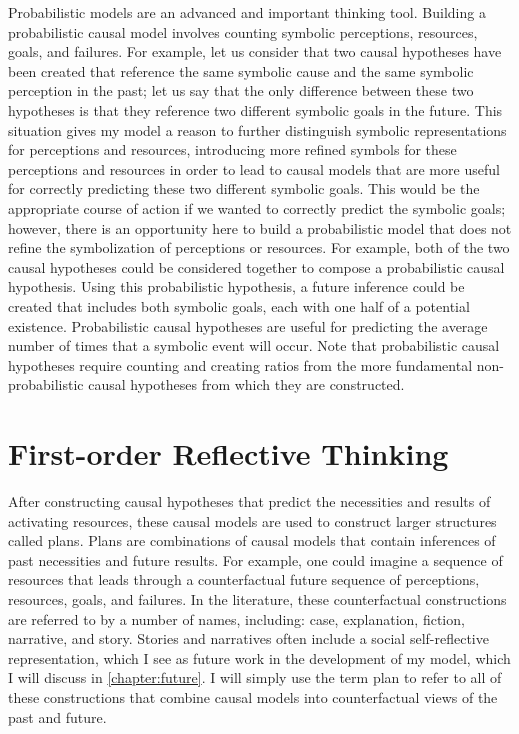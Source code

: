 Probabilistic models are an advanced and important thinking tool.
Building a probabilistic causal model involves counting symbolic
perceptions, resources, goals, and failures.  For example, let us
consider that two causal hypotheses have been created that reference
the same symbolic cause and the same symbolic perception in the past;
let us say that the only difference between these two hypotheses is
that they reference two different symbolic goals in the future.  This
situation gives my model a reason to further distinguish symbolic
representations for perceptions and resources, introducing more
refined symbols for these perceptions and resources in order to lead
to causal models that are more useful for correctly predicting these
two different symbolic goals.  This would be the appropriate course of
action if we wanted to correctly predict the symbolic goals; however,
there is an opportunity here to build a probabilistic model that does
not refine the symbolization of perceptions or resources.  For
example, both of the two causal hypotheses could be considered
together to compose a probabilistic causal hypothesis.  Using this
probabilistic hypothesis, a future inference could be created that
includes both symbolic goals, each with one half of a potential
existence.  Probabilistic causal hypotheses are useful for predicting
the average number of times that a symbolic event will occur.  Note
that probabilistic causal hypotheses require counting and creating
ratios from the more fundamental non-probabilistic causal hypotheses
from which they are constructed.

\section{First-order Reflective Thinking}

After constructing causal hypotheses that predict the necessities and
results of activating resources, these causal models are used to
construct larger structures called plans.  Plans are combinations of
causal models that contain inferences of past necessities and future
results.  For example, one could imagine a sequence of resources that
leads through a counterfactual future sequence of perceptions,
resources, goals, and failures.  In the literature, these
counterfactual constructions are referred to by a number of names,
including: case, explanation, fiction, narrative, and story.  Stories
and narratives often include a social self-reflective representation,
which I see as future work in the development of my model, which I
will discuss in \autoref{chapter:future}.  I will simply use the term
plan to refer to all of these constructions that combine causal models
into counterfactual views of the past and future.

